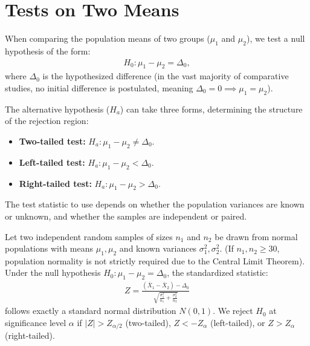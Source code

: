 \section{Tests on Two Means}

When comparing the population means of two groups ($\mu_1$ and $\mu_2$), we test a null hypothesis of the form:
\begin{align}
	H_0: \mu_1 - \mu_2 = \Delta_0,
\end{align}
where $\Delta_0$ is the hypothesized difference (in the vast majority of comparative studies, no initial difference is postulated, meaning $\Delta_0 = 0 \implies \mu_1 = \mu_2$).

The alternative hypothesis ($H_a$) can take three forms, determining the structure of the rejection region:
\begin{itemize}
	\item \textbf{Two-tailed test:} $H_a: \mu_1 - \mu_2 \neq \Delta_0$.
	\item \textbf{Left-tailed test:} $H_a: \mu_1 - \mu_2 < \Delta_0$.
	\item \textbf{Right-tailed test:} $H_a: \mu_1 - \mu_2 > \Delta_0$.
\end{itemize}

The test statistic to use depends on whether the population variances are known or unknown, and whether the samples are independent or paired.

\begin{teorema}
	Let two independent random samples of sizes $n_1$ and $n_2$ be drawn from normal populations with means $\mu_1, \mu_2$ and known variances $\sigma_1^2, \sigma_2^2$. (If $n_1, n_2 \geq 30$, population normality is not strictly required due to the Central Limit Theorem). Under the null hypothesis $H_0: \mu_1 - \mu_2 = \Delta_0$, the standardized statistic:
	\begin{align}
		Z = \frac{(\bar{X}_1 - \bar{X}_2) - \Delta_0}{\sqrt{\frac{\sigma_1^2}{n_1} + \frac{\sigma_2^2}{n_2}}}
	\end{align}
	follows exactly a standard normal distribution $N(0,1)$. We reject $H_0$ at significance level $\alpha$ if $|Z| > Z_{\alpha/2}$ (two-tailed), $Z < -Z_\alpha$ (left-tailed), or $Z > Z_\alpha$ (right-tailed).
\end{teorema}

